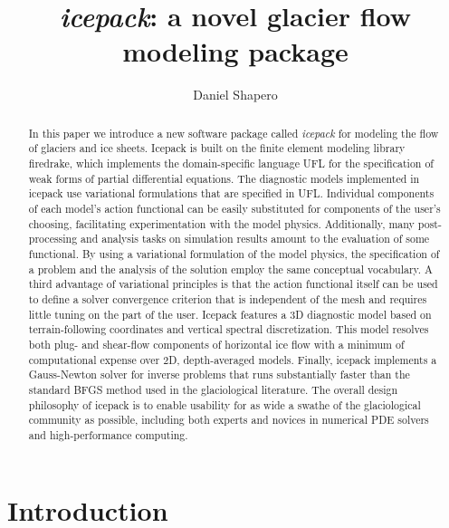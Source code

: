 \documentclass{article}
\title{\emph{icepack}: a novel glacier flow modeling package}
\author{Daniel Shapero}
\date{}
\theoremstyle{definition}
\theoremstyle{plain}
\begin{document}
\tableofcontents
\newpage

\maketitle

\begin{abstract}
In this paper we introduce a new software package called \emph{icepack} for modeling the flow of glaciers and ice sheets.
Icepack is built on the finite element modeling library firedrake, which implements the domain-specific language UFL for the specification of weak forms of partial differential equations.
The diagnostic models implemented in icepack use variational formulations that are specified in UFL.
Individual components of each model's action functional can be easily substituted for components of the user's choosing, facilitating experimentation with the model physics.
Additionally, many post-processing and analysis tasks on simulation results amount to the evaluation of some functional.
By using a variational formulation of the model physics, the specification of a problem and the analysis of the solution employ the same conceptual vocabulary.
A third advantage of variational principles is that the action functional itself can be used to define a solver convergence criterion that is independent of the mesh and requires little tuning on the part of the user.
Icepack features a 3D diagnostic model based on terrain-following coordinates and vertical spectral discretization.
This model resolves both plug- and shear-flow components of horizontal ice flow with a minimum of computational expense over 2D, depth-averaged models.
Finally, icepack implements a Gauss-Newton solver for inverse problems that runs substantially faster than the standard BFGS method used in the glaciological literature.
The overall design philosophy of icepack is to enable usability for as wide a swathe of the glaciological community as possible, including both experts and novices in numerical PDE solvers and high-performance computing.
\end{abstract}

\section{Introduction}
\end{document}
